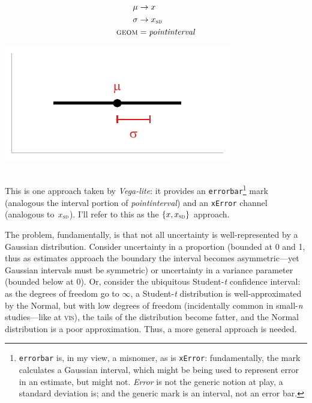 \documentclass[journal]{vgtc}                     %
\newcommand{\equationfigure}[2]{%
\noindent
\begin{minipage}{.5\columnwidth}
\setlength{\abovedisplayskip}{0pt}
\setlength{\belowdisplayskip}{0pt}
#1\end{minipage}%
\begin{minipage}{.4\columnwidth}\centering #2 \end{minipage}%
\vspace{.5\belowdisplayskip}\\
}
\begin{document}
\equationfigure{
\begin{align*}
\mu &\rightarrow x\\
\sigma &\rightarrow x_\textsc{sd}\\
\textsc{geom} &= \mathit{pointinterval}
\end{align*}
}{\includegraphics[width=1.2\columnwidth]{figs/2-mean_sd_interval.pdf}}
This is one approach taken by \textit{Vega-lite}: it provides an \texttt{errorbar}\footnote{\label{foot:errorbar}\texttt{errorbar} is, in my view, a misnomer, as is \texttt{xError}: fundamentally, the mark calculates a Gaussian interval, which might be being used to represent error in an estimate, but might not. \textit{Error} is not the generic notion at play, a standard deviation is; and the generic mark is an interval, not an error bar.} mark (analogous the interval portion of \textit{pointinterval}) and an \texttt{xError}  channel (analogous to $x_\textsc{sd}$). I'll refer to this as the $\{x, x_\textsc{sd}\}$ approach.

The problem, fundamentally, is that not all uncertainty is well-represented by a Gaussian distribution. Consider uncertainty in a proportion (bounded at 0 and 1, thus as estimates approach the boundary the interval becomes asymmetric---yet Gaussian intervals must be symmetric) or uncertainty in a variance parameter (bounded below at 0). Or, consider the ubiquitous Student-\textit{t} confidence interval: as the degrees of freedom go to $\infty$, a Student-\textit{t} distribution is well-approximated by the Normal, but with low degrees of freedom (incidentally common in small-\textit{n} studies---like at \textsc{vis}), the tails of the distribution become fatter, and the Normal distribution is a poor approximation. Thus, a more general approach is needed.
\end{document}
